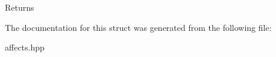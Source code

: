 \begin{DoxyReturn}{Returns}

\end{DoxyReturn}


The documentation for this struct was generated from the following file\+:\begin{DoxyCompactItemize}
\item 
affects.\+hpp\end{DoxyCompactItemize}
